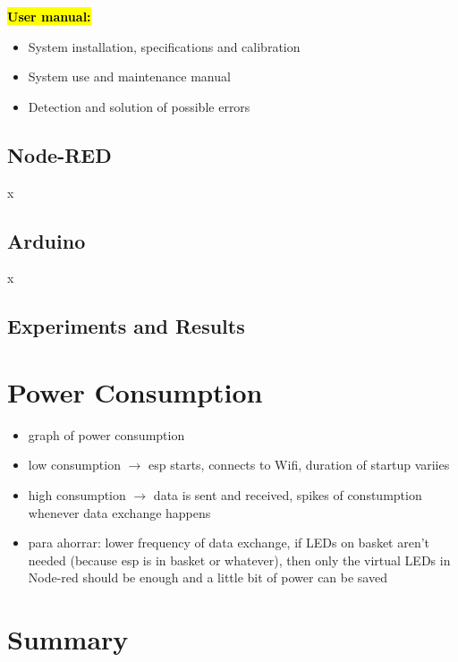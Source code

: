 \documentclass{article}
\begin{document}
\textcolor{red}{\textbf{\hl{User manual:}}}
\begin{itemize}
	\item System installation, specifications and calibration
	\item System use and maintenance manual
	\item Detection and solution of possible errors
\end{itemize}

\subsection{Node-RED}
x

\subsection{Arduino}
x

\subsection{Experiments and Results}
\section{Power Consumption}
\begin{itemize}
\item graph of power consumption
\item low consumption $\to$ esp starts, connects to Wifi, duration of startup variies
\item high consumption $\to$ data is sent and received, spikes of constumption whenever data exchange happens
\item para ahorrar: lower frequency of data exchange, if LEDs on basket aren't needed (because esp is in basket or whatever), then only the virtual LEDs in Node-red should be enough and a little bit of power can be saved
\end{itemize}

\section{Summary}
\end{document}
